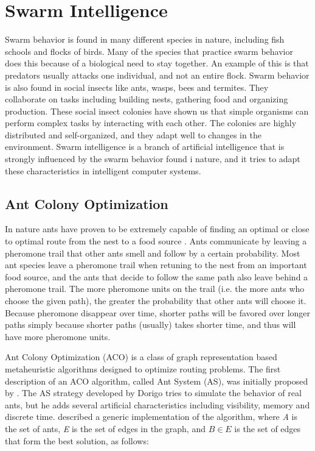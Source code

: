 \section{Swarm Intelligence}

Swarm behavior is found in many different species in nature, including fish schools and flocks of birds. Many of the species that practice swarm behavior does this because of a biological need to stay together. An example of this is that predators usually attacks one individual, and not an entire flock. Swarm behavior is also found in social insects like ants, wasps, bees and termites. They collaborate on tasks including building nests, gathering food and organizing production. These social insect colonies have shown us that simple organisms can perform complex tasks by interacting with each other. The colonies are highly distributed and self-organized, and they adapt well to changes in the environment. Swarm intelligence \citep{beni89} is a branch of artificial intelligence that is strongly influenced by the swarm behavior found i nature, and it tries to adapt these characteristics in intelligent computer systems.

\subsection{Ant Colony Optimization}
In nature ants have proven to be extremely capable of finding an optimal or close to optimal route from the nest to a food source \citep{deneubourg90}. Ants communicate by leaving a pheromone trail that other ants smell and follow by a certain probability. Most ant species leave a pheromone trail when retuning to the nest from an important food source, and the ants that decide to follow the same path also leave behind a pheromone trail. The more pheromone units on the trail (i.e. the more ants who choose the given path), the greater the probability that other ants will choose it. Because pheromone disappear over time, shorter paths will be favored over longer paths simply because shorter paths (usually) takes shorter time, and thus will have more pheromone units. 

Ant Colony Optimization (ACO) is a class of graph representation based metaheuristic algorithms designed to optimize routing problems. The first description of an ACO algorithm, called Ant System (AS), was initially proposed by \citet{dorigo96}. The AS strategy developed by Dorigo tries to simulate the behavior of real ants, but he adds several artificial characteristics including visibility, memory and discrete time. \citet{nanda11} described a generic implementation of the algorithm, where \textit{A} is the set of ants, \textit{E} is the set of edges in the graph, and $B \in E$ is the set of edges that form the best solution, as follows: \\

